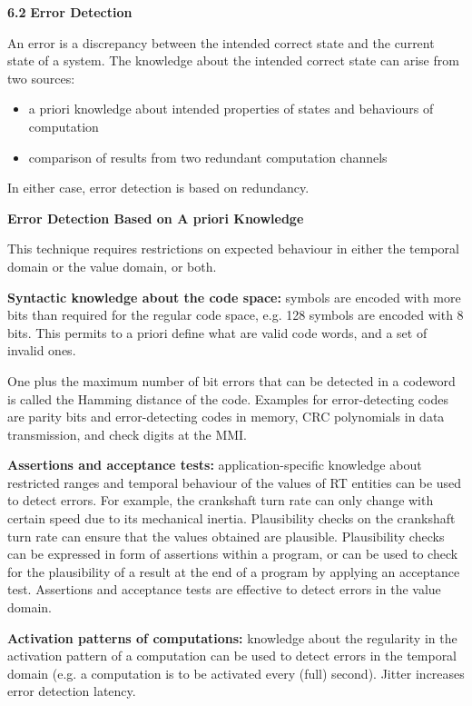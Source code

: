 \textbf{6.2} \protect\hypertarget{teil3}{}{}\textbf{Error Detection }

An error is a discrepancy between the intended correct state and the
current state of a system. The knowledge about the intended correct
state can arise from two sources:

\begin{itemize}
\item
  a priori knowledge about intended properties of states and behaviours
  of computation
\item
  comparison of results from two redundant computation channels
\end{itemize}

In either case, error detection is based on redundancy.

\textbf{Error Detection Based on A priori Knowledge}

This technique requires restrictions on expected behaviour in either the
temporal domain or the value domain, or both.

\textbf{Syntactic knowledge about the code space:} symbols are encoded
with more bits than required for the regular code space, e.g. 128
symbols are encoded with 8 bits. This permits to a priori define what
are valid code words, and a set of invalid ones.

One plus the maximum number of bit errors that can be detected in a
codeword is called the Hamming distance of the code. Examples for
error-detecting codes are parity bits and error-detecting codes in
memory, CRC polynomials in data transmission, and check digits at the
MMI.

\textbf{Assertions and acceptance tests:} application-specific knowledge
about restricted ranges and temporal behaviour of the values of RT
entities can be used to detect errors. For example, the crankshaft turn
rate can only change with certain speed due to its mechanical inertia.
Plausibility checks on the crankshaft turn rate can ensure that the
values obtained are plausible. Plausibility checks can be expressed in
form of assertions within a program, or can be used to check for the
plausibility of a result at the end of a program by applying an
acceptance test. Assertions and acceptance tests are effective to detect
errors in the value domain.

\textbf{Activation patterns of computations:} knowledge about the
regularity in the activation pattern of a computation can be used to
detect errors in the temporal domain (e.g. a computation is to be
activated every (full) second). Jitter increases error detection
latency.

